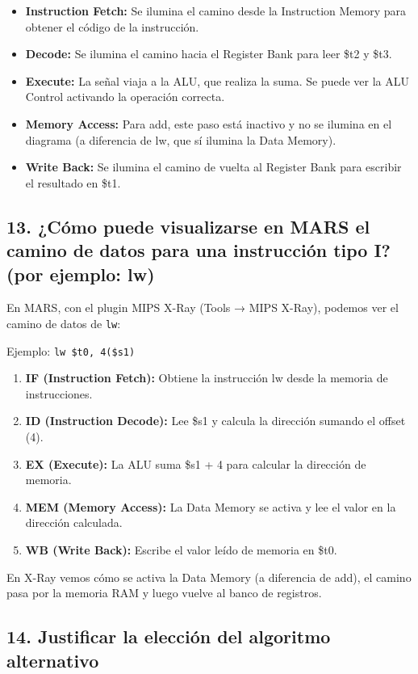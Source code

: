 \documentclass[12pt]{article}
\begin{document}
\begin{itemize}
    \item \textbf{Instruction Fetch:} Se ilumina el camino desde la Instruction Memory para obtener el código de la instrucción.
    \item \textbf{Decode:} Se ilumina el camino hacia el Register Bank para leer \$t2 y \$t3.
    \item \textbf{Execute:} La señal viaja a la ALU, que realiza la suma. Se puede ver la ALU Control activando la operación correcta.
    \item \textbf{Memory Access:} Para add, este paso está inactivo y no se ilumina en el diagrama (a diferencia de lw, que sí ilumina la Data Memory).
    \item \textbf{Write Back:} Se ilumina el camino de vuelta al Register Bank para escribir el resultado en \$t1.
\end{itemize}

\subsection*{13. ¿Cómo puede visualizarse en MARS el camino de datos para una instrucción tipo I? (por ejemplo: lw)}

En MARS, con el plugin MIPS X-Ray (Tools → MIPS X-Ray), podemos ver el camino de datos de \texttt{lw}:

Ejemplo: \texttt{lw \$t0, 4(\$s1)}

\begin{enumerate}
    \item \textbf{IF (Instruction Fetch):} Obtiene la instrucción lw desde la memoria de instrucciones.
    \item \textbf{ID (Instruction Decode):} Lee \$s1 y calcula la dirección sumando el offset (4).
    \item \textbf{EX (Execute):} La ALU suma \$s1 + 4 para calcular la dirección de memoria.
    \item \textbf{MEM (Memory Access):} La Data Memory se activa y lee el valor en la dirección calculada.
    \item \textbf{WB (Write Back):} Escribe el valor leído de memoria en \$t0.
\end{enumerate}

En X-Ray vemos cómo se activa la Data Memory (a diferencia de add), el camino pasa por la memoria RAM y luego vuelve al banco de registros.

\subsection*{14. Justificar la elección del algoritmo alternativo}
\end{document}
